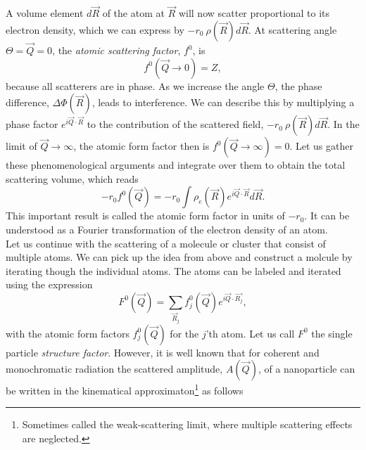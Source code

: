 %
A volume element $d\vec{R}$ of the atom at $\vec{R}$ will now scatter proportional to its electron density, which we can express by $-r_{0}\ \rho\left(\vec{R}\right)d\vec{R}$. At scattering angle $\Theta=\vec{Q}=0$, the \textit{atomic scattering factor}, $f^{0}$, is
\begin{equation}
f^{0}\left(\vec{Q}\rightarrow 0\right)=Z,
\label{eq:transform-number-of-particles}
\end{equation}
because all scatterers are in phase. As we increase the angle $\Theta$, the phase difference, $\Delta \Phi\left(\vec{R}\right)$, leads to interference. We can describe this by multiplying a phase factor $e^{i \vec{Q}\cdot \vec{R}}$ to the contribution of the scattered field, $-r_{0}\ \rho\left(\vec{R}\right)d\vec{R}$. In the limit of $\vec{Q}\rightarrow\infty$, the atomic form factor then is $f^{0}\left(\vec{Q}\rightarrow\infty\right)=0$. Let us gather these phenomenological arguments and integrate over them to obtain the total scattering volume, which reads
\begin{equation}
-r_{0} f^{0}\left(\vec{Q}\right)=-r_{0}\int\rho_{e}\left(\vec{R}\right)e^{i \vec{Q}\cdot \vec{R}}d\vec{R}.
\label{eq:scattering-integral}
\end{equation}
This important result is called the atomic form factor in units of $-r_{0}$. It can be understood as a Fourier transformation of the electron density of an atom.\\[1\baselineskip]
%
Let us continue with the scattering of a molecule or cluster that consist of multiple atoms. We can pick up the idea from above and construct a molcule by iterating though the individual atoms. The atoms can be labeled and iterated using the expression
\begin{equation}
F^{0}\left(\vec{Q}\right)=\sum_{\vec{R}_j}f_{j}^{0}\left(\vec{Q}\right)e^{i \vec{Q}\cdot \vec{R_{j}}},
\label{eq:scattering-factor-object}
\end{equation}
with the atomic form factors $f_{j}^{0}\left(\vec{Q}\right)$ for the $j$'th atom. Let us call $F^{0}$ the single particle \textit{structure factor}. However, it is well known that for coherent and monochromatic radiation the scattered amplitude, $A(\vec{Q})$, of a nanoparticle can be written in the kinematical approximaton\footnote{Sometimes called the weak-scattering limit, where multiple scattering effects are neglected.} as follows \citep{Vartanyants-2001-JOP}
